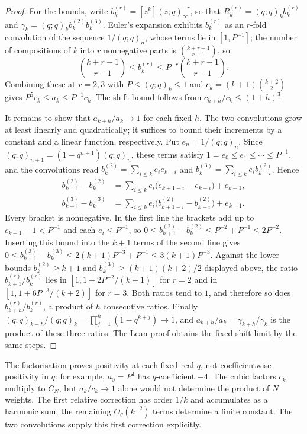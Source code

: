 \documentclass[11pt]{article}
\newcommand{\latecommit}{035c414b25fda09ae0d2e56358b8716d321ebd99}
\newcommand{\laterepobase}{https://github.com/wcook04/plectis-erdos/blob/\latecommit}
\begin{document}
\begin{proof}
For the bounds, write $b_k^{(r)}=[z^k](z;q)_\infty^{-r}$, so that
$R_k^{(r)}=(q;q)_kb_k^{(r)}$ and
$\gamma_k=(q;q)_kb_k^{(2)}b_k^{(3)}$. Euler's expansion exhibits $b_k^{(r)}$ as
an $r$-fold convolution of the sequence $1/(q;q)_n$, whose terms lie in
$[1,P^{-1}]$; the number of compositions of $k$ into $r$ nonnegative parts is
$\binom{k+r-1}{r-1}$, so
\[
 \binom{k+r-1}{r-1}\le b_k^{(r)}\le P^{-r}\binom{k+r-1}{r-1}.
\]
Combining these at $r=2,3$ with $P\le(q;q)_k\le1$ and
$c_k=(k+1)\binom{k+2}2$ gives $P^5c_k\le a_k\le P^{-1}c_k$. The shift bound
follows from $c_{k+h}/c_k\le(1+h)^3$.

It remains to show that $a_{k+h}/a_k\to1$ for each fixed $h$.
The two convolutions grow at least linearly and quadratically;
it suffices to bound their increments by a constant and a linear
function, respectively. Put $e_n=1/(q;q)_n$. Since $(q;q)_{n+1}=(1-q^{n+1})(q;q)_n$, these terms satisfy
$1=e_0\le e_1\le\cdots\le P^{-1}$, and the convolutions read
$b_k^{(2)}=\sum_{i\le k}e_ie_{k-i}$ and
$b_k^{(3)}=\sum_{i\le k}e_ib_{k-i}^{(2)}$. Hence
\[
 \begin{aligned}
 b_{k+1}^{(2)}-b_k^{(2)}
 &=\sum_{i\le k}e_i\bigl(e_{k+1-i}-e_{k-i}\bigr)+e_{k+1},\\
 b_{k+1}^{(3)}-b_k^{(3)}
 &=\sum_{i\le k}e_i\bigl(b_{k+1-i}^{(2)}-b_{k-i}^{(2)}\bigr)+e_{k+1}.
 \end{aligned}
\]
Every bracket is nonnegative. In the first line the brackets add up to
$e_{k+1}-1<P^{-1}$ and each $e_i\le P^{-1}$, so
$0\le b_{k+1}^{(2)}-b_k^{(2)}\le P^{-2}+P^{-1}\le2P^{-2}$. Inserting this
bound into the $k+1$ terms of the second line gives
$0\le b_{k+1}^{(3)}-b_k^{(3)}\le2(k+1)P^{-3}+P^{-1}\le3(k+1)P^{-3}$.
Against the lower bounds $b_k^{(2)}\ge k+1$ and
$b_k^{(3)}\ge(k+1)(k+2)/2$ displayed above, the ratio
$b_{k+1}^{(r)}/b_k^{(r)}$ lies in $[1,1+2P^{-2}/(k+1)]$ for $r=2$ and in
$[1,1+6P^{-3}/(k+2)]$ for $r=3$. Both ratios tend to $1$, and therefore so
does $b_{k+h}^{(r)}/b_k^{(r)}$, a product of $h$ consecutive ratios.
Finally $(q;q)_{k+h}/(q;q)_k=\prod_{j=1}^h(1-q^{k+j})\to1$, and
$a_{k+h}/a_k=\gamma_{k+h}/\gamma_k$ is the product of these three ratios.
The Lean proof obtains the
\href{\laterepobase/lean/ErdosProblems/Erdos1049/PaperCompleteR21/RogersFactorisationAnalytic.lean\#L1097}{fixed-shift limit}
by the same steps.
\end{proof}

The factorisation proves positivity at each fixed real $q$, not
coefficientwise positivity in $q$: for example, $a_0=P^4$ has
$q$-coefficient $-4$. The cubic factors $c_k$ multiply to $C_N$,
but $a_k/c_k\to1$ alone would not determine the product of $N$ weights. The first
relative correction has order $1/k$ and accumulates as a harmonic
sum; the remaining $O_q(k^{-2})$ terms determine a finite constant.
The two convolutions supply this first correction explicitly.
\end{document}
